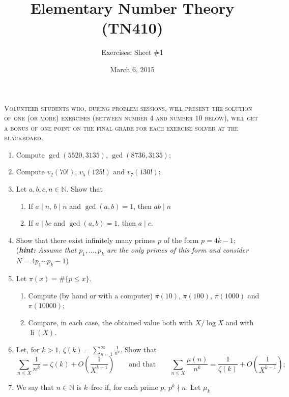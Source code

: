 \documentclass[a4paper,10pt]{article}
\title{Elementary Number Theory (TN410)}
\author{Exercises: Sheet \#1}
\date{March 6, 2015}
\begin{document}
\maketitle


\noindent\textsc{Volunteer students who, during problem sessions, will
present the solution of one (or more) exercises (between number $4$ and number $10$ below),
will get a bonus of one point on the final grade for each exercise solved at the blackboard.}

\thispagestyle{empty}
\begin{enumerate}
 \item Compute $\gcd(5520,3135)$, $\gcd(8736,3135)$;
 \item Compute  $v_2(70!)$, $v_5(125!)$ and $v_7(130!)$;
\item Let $a,b,c,n\in \mathbb N$. Show that
\begin{enumerate}
 \item  If $a\mid n$, $b\mid n$ and $\gcd(a,b)=1$, then $ab\mid n$
 \item If $a\mid bc$ and $\gcd(a,b)=1$, then $a\mid c$.
\end{enumerate}
 \item Show that there exist infinitely many primes $p$ of the form $p=4k-1$;\\
\small{(\textit{\textbf{hint:} Assume that $p_1,\ldots,p_k$ are the only primes of this form and consider $N=4p_1\cdots p_k-1$})}
 \item Let $\pi(x)=\#\{p\le x\}$.
 \begin{enumerate}
  \item  Compute (by hand or with a computer) $\pi(10)$, $\pi(100)$, $\pi(1000)$ and $\pi(10000)$;
  \item  Compare, in each case, the obtained value both with  $X/\log X$ and with $\operatorname{li}(X)$.
 \end{enumerate}
\item Let, for $k>1$, $\zeta(k)=\sum_{n=1}^\infty\frac1{n^k}$. Show that
$$\sum_{n\le X}\frac1{n^k}=\zeta(k)+O\left(\frac1{X^{k-1}}\right)\qquad
\text{and that}
\qquad\sum_{n\le X}\frac{\mu(n)}{n^k}=\frac{1}{\zeta(k)}+O\left(\frac1{X^{k-1}}\right);$$
\item We say that $n\in\mathbb N$ is $k$--free if, for each prime $p$, $p^k\nmid n$. Let $\mu_k$ 

\end{enumerate}
\end{document}
